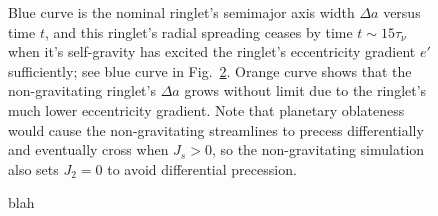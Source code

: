 \documentclass[preprint]{aastex62}
\begin{document}
\begin{figure}
    \caption{
        \label{fig:da_nogravity}
        Blue curve is the nominal ringlet's semimajor axis width $\Delta a$ versus time $t$,
        and this ringlet's radial spreading ceases by time $t\sim15\tau_\nu$ when it's self-gravity
        has excited the ringlet's eccentricity gradient $e'$ sufficiently; 
        see blue curve in Fig.\ \ref{fig:de_prime_nogravity}. Orange curve shows that
        the non-gravitating ringlet's $\Delta a$ grows without limit due to the ringlet's
        much lower eccentricity gradient. Note that planetary oblateness would
        cause the non-gravitating streamlines to precess differentially and eventually cross
        when $J_s>0$, so the non-gravitating simulation also sets $J_2=0$ 
        to avoid differential precession.
    }
\end{figure}

\begin{figure}
    \caption{
        \label{fig:de_prime_nogravity}
        blah
    }
\end{figure}


\end{document}
